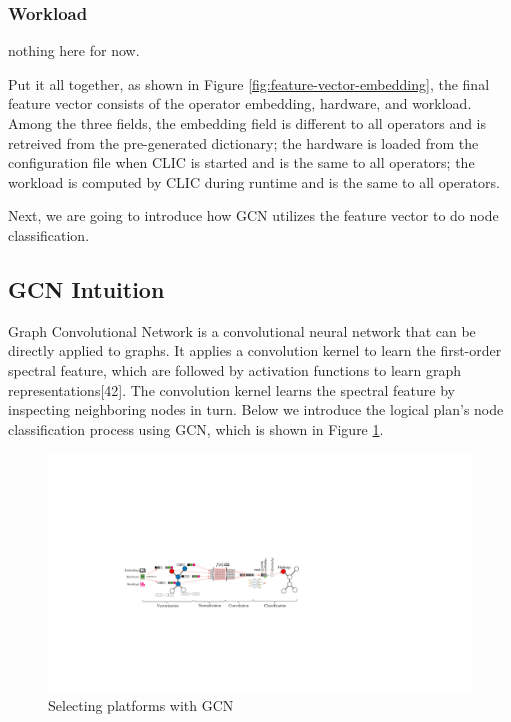 \subsubsection{Workload}
nothing here for now.


Put it all together, as shown in Figure \ref{fig:feature-vector-embedding}, 
the final feature vector consists of the operator embedding, hardware, and workload.
Among the three fields, 
the embedding field is different to all operators and is retreived from the pre-generated dictionary; 
the hardware is loaded from the configuration file when CLIC is started and is the same to all operators;
the workload is computed by CLIC during runtime and is the same to all operators.

Next, we are going to introduce how GCN utilizes the feature vector to do node classification.

\subsection{GCN Intuition}

Graph Convolutional Network is a convolutional neural network that can be directly applied to graphs. 
It applies a convolution kernel to learn the first-order spectral feature, which are followed by activation functions to learn graph representations[42]. 
The convolution kernel learns the spectral feature by inspecting neighboring nodes in turn. 
Below we introduce the logical plan's node classification process using GCN, which is shown in Figure \ref{fig:gcn}.

\begin{figure}
  \centering
  \includegraphics[width=\linewidth]{figures/GCN-new.pdf}
  \caption{Selecting platforms with GCN}
  \label{fig:gcn}
\end{figure}

